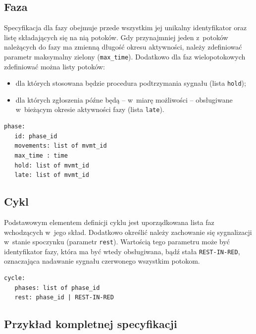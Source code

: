 \documentclass{pracamgr}
\theoremstyle{plain}
\begin{document}
\subsection{Faza} Specyfikacja dla fazy obejmuje przede wszystkim jej
unikalny identyfikator oraz listę składających się na nią potoków.
Gdy przynajmniej jeden z~potoków należących do fazy ma zmienną długość
okresu aktywności, należy zdefiniować parametr maksymalny zielony
(\texttt{max\_time}).  Dodatkowo dla faz wielopotokowych zdefiniować
można listy potoków:
\begin{itemize}
  \item dla których stosowana będzie procedura podtrzymania sygnału
  (lista \texttt{hold});
  \item dla których zgłoszenia późne będą -- w~miarę możliwości --
  obsługiwane w~bieżącym okresie aktywności fazy (lista \texttt{late}).
\end{itemize}
\noindent\begin{minipage}{1.0\linewidth}
\begin{lstlisting}[caption=Schemat opisu fazy.]
phase:
   id: phase_id
   movements: list of mvmt_id
   max_time : time
   hold: list of mvmt_id
   late: list of mvmt_id
\end{lstlisting}
\end{minipage}

\subsection{Cykl} Podstawowym elementem definicji cyklu jest
uporządkowana lista faz wchodzących w~jego skład. Dodatkowo określić
należy zachowanie się sygnalizacji w~stanie spoczynku (parametr
\texttt{rest}). Wartością tego parametru może być identyfikator fazy,
która ma być wtedy obsługiwana, bądź stała \texttt{REST-IN-RED},
oznaczająca nadawanie sygnału czerwonego wszystkim potokom.

\noindent\begin{minipage}{1.0\linewidth}
\begin{lstlisting}[caption=Schemat opisu cyklu.]
cycle:
   phases: list of phase_id
   rest: phase_id | REST-IN-RED
\end{lstlisting}
\end{minipage}
  
\subsection{Przykład kompletnej specyfikacji}
\end{document}
